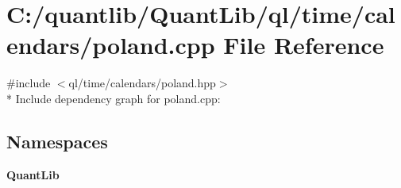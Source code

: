 \section{C\+:/quantlib/\+Quant\+Lib/ql/time/calendars/poland.cpp File Reference}
\label{poland_8cpp}
{\ttfamily \#include $<$ql/time/calendars/poland.\+hpp$>$}\\*
Include dependency graph for poland.\+cpp\+:
\subsection*{Namespaces}
\begin{DoxyCompactItemize}
\item 
 {\bf Quant\+Lib}
\end{DoxyCompactItemize}
